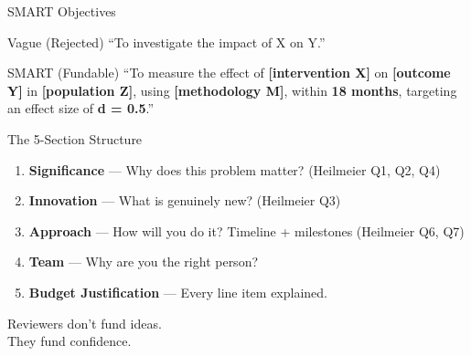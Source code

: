 \documentclass[aspectratio=169]{beamer}
\begin{document}
\begin{frame}{SMART Objectives}
  \begin{alertblock}{Vague (Rejected)}
    ``To investigate the impact of X on Y.''
  \end{alertblock}
  \begin{exampleblock}{SMART (Fundable)}
    ``To measure the effect of \textbf{[intervention X]} on \textbf{[outcome Y]} in \textbf{[population Z]}, using \textbf{[methodology M]}, within \textbf{18 months}, targeting an effect size of \textbf{d = 0.5}.''
  \end{exampleblock}
\end{frame}

\begin{frame}{The 5-Section Structure}
  \begin{enumerate}
    \item \textbf{Significance} — Why does this problem matter? (Heilmeier Q1, Q2, Q4)
    \item \textbf{Innovation} — What is genuinely new? (Heilmeier Q3)
    \item \textbf{Approach} — How will you do it? Timeline + milestones (Heilmeier Q6, Q7)
    \item \textbf{Team} — Why are you the right person?
    \item \textbf{Budget Justification} — Every line item explained.
  \end{enumerate}
\end{frame}

\begin{frame}[standout]
  Reviewers don't fund ideas.\\
  They fund confidence.
\end{frame}
\end{document}
